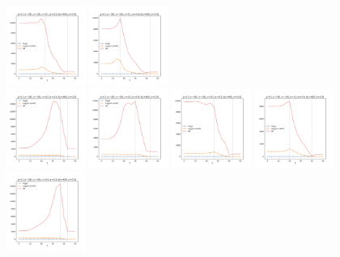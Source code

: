 \documentclass[a4paper]{article}
\begin{document}
\begin{figure}[H]
  \includegraphics[width=0.23\textwidth]{grid-g4-v4-w3_0}
  \includegraphics[width=0.23\textwidth]{grid-g4-v4-w4_0}
  \\
  \includegraphics[width=0.23\textwidth]{grid-g4-v5-w1_0}
  \includegraphics[width=0.23\textwidth]{grid-g4-v5-w2_0}
  \includegraphics[width=0.23\textwidth]{grid-g4-v5-w3_0}
  \includegraphics[width=0.23\textwidth]{grid-g4-v5-w4_0}
  \\
  \includegraphics[width=0.23\textwidth]{grid-g4-v6-w1_0}

\end{figure}
\end{document}
